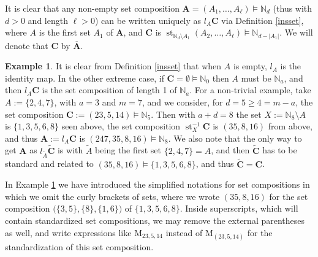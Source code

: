 \documentclass{article}
\theoremstyle{definition}
\newtheorem{ex}[thm]{Example}
\begin{document}
It is clear that any non-empty set composition $\mathbf{A}=(A_{1},\ldots,A_{\ell})\vDash\mathbb{N}_{d}$ (thus with $d>0$ and length $\ell>0$) can be written uniquely as $l_{A}\mathbf{C}$ via Definition \ref{insset}, where $A$ is the first set $A_{1}$ of $\mathbf{A}$, and $\mathbf{C}$ is $\operatorname{st}_{\mathbb{N}_{d} \setminus A_{1}}(A_{2},\ldots,A_{\ell})\vDash\mathbb{N}_{d-|A_{1}|}$. We will denote that $\mathbf{C}$ by $\overline{\mathbf{A}}$.
\begin{ex}
It is clear from Definition \ref{insset} that when $A$ is empty, $l_{A}$ is the identity map. In the other extreme case, if $\mathbf{C}=\emptyset\vDash\mathbb{N}_{0}$ then $A$ must be $\mathbb{N}_{a}$, and then $l_{A}\mathbf{C}$ is the set composition of length 1 of $\mathbb{N}_{a}$. For a non-trivial example, take $A:=\{2,4,7\}$, with $a=3$ and $m=7$, and we consider, for $d=5\geq4=m-a$, the set composition $\mathbf{C}:=(23,5,14)\vDash\mathbb{N}_{5}$. Then with $a+d=8$ the set $X:=\mathbb{N}_{8} \setminus A$ is $\{1,3,5,6,8\}$ seen above, the set composition $\operatorname{st}_{X}^{-1}\mathbf{C}$ is $(35,8,16)$ from above, and thus $\mathbf{A}:=l_{A}\mathbf{C}$ is $(247,35,8,16)\vDash\mathbb{N}_{8}$. We also note that the only way to get $\mathbf{A}$ as $l_{\tilde{A}}\tilde{\mathbf{C}}$ is with $\tilde{A}$ being the first set $\{2,4,7\}=A$, and then $\tilde{\mathbf{C}}$ has to be standard and related to $(35,8,16)\vDash\{1,3,5,6,8\}$, and thus $\tilde{\mathbf{C}}=\mathbf{C}$. \label{exlA}
\end{ex}
In Example \ref{exlA} we have introduced the simplified notations for set compositions in which we omit the curly brackets of sets, where we wrote $(35,8,16)$ for the set composition $\big(\{3,5\},\{8\},\{1,6\}\big)$ of $\{1,3,5,6,8\}$. Inside superscripts, which will contain standardized set compositions, we may remove the external parentheses as well, and write expressions like $\mathrm{M}_{23,5,14}$ instead of $\mathrm{M}_{(23,5,14)}$ for the standardization of this set composition.
\end{document}
